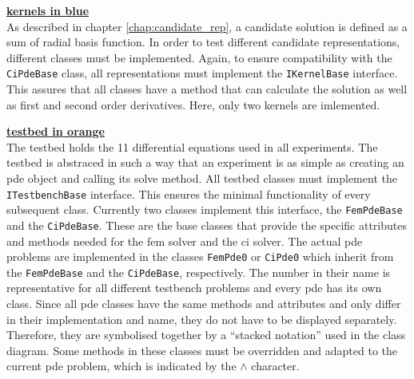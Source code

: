 \documentclass[./\jobname.tex]{subfiles}
\begin{document}
\textcolor{kernels_colour}{\large \underline{\textbf{kernels in blue}}} \\
As described in chapter \ref{chap:candidate_rep}, a candidate solution is defined as a sum of radial basis function. In order to test different candidate representations, different classes must be implemented. Again, to ensure compatibility with the \colorbox{light-gray}{\lstinline[basicstyle=\ttfamily\color{black}]|CiPdeBase|} class, all representations must implement the \colorbox{light-gray}{\lstinline[basicstyle=\ttfamily\color{black}]|IKernelBase|} interface. This assures that all classes have a method that can calculate the solution as well as first and second order derivatives. Here, only two kernels are imlemented.

\textcolor{testbed_colour}{\large \underline{\textbf{testbed in orange}}} \\
The testbed holds the 11 differential equations used in all experiments. The testbed is abstraced in such a way that an experiment is as simple as creating an \gls{pde} object and calling its solve method. All testbed classes must implement the \colorbox{light-gray}{\lstinline[basicstyle=\ttfamily\color{black}]|ITestbenchBase|} interface. This ensures the minimal functionality of every subsequent class. Currently two classes implement this interface, the \colorbox{light-gray}{\lstinline[basicstyle=\ttfamily\color{black}]|FemPdeBase|} and the \colorbox{light-gray}{\lstinline[basicstyle=\ttfamily\color{black}]|CiPdeBase|}. These are the base classes that provide the specific attributes and methods needed for the \gls{fem} solver and the \gls{ci} solver. The actual \gls{pde} problems are implemented in the classes \colorbox{light-gray}{\lstinline[basicstyle=\ttfamily\color{black}]|FemPde0|} or \colorbox{light-gray}{\lstinline[basicstyle=\ttfamily\color{black}]|CiPde0|} which inherit from the \colorbox{light-gray}{\lstinline[basicstyle=\ttfamily\color{black}]|FemPdeBase|} and the \colorbox{light-gray}{\lstinline[basicstyle=\ttfamily\color{black}]|CiPdeBase|}, respectively. The number in their name is representative for all different testbench problems and every \gls{pde} has its own class. Since all \gls{pde} classes have the same methods and attributes and only differ in their implementation and name, they do not have to be displayed separately. Therefore, they are symbolised together by a ``stacked notation'' used in the class diagram. Some methods in these classes must be overridden and adapted to the current \gls{pde} problem, which is indicated by the $\land$ character.
\end{document}
